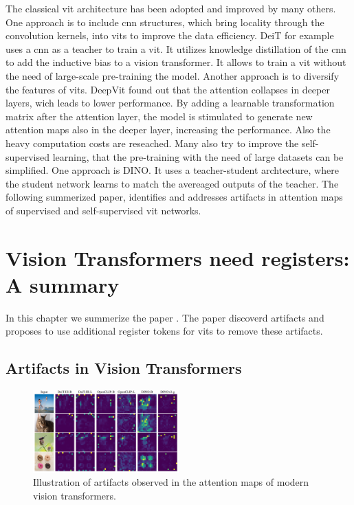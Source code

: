 \documentclass[conference]{IEEEtran}
\begin{document}
  The classical \ac{vit} architecture has been adopted and improved by many others. One approach is to include \ac{cnn} structures, which bring locality through the convolution kernels, into \acp{vit} to improve the data efficiency. DeiT \cite{deit} for example uses a \ac{cnn} as a teacher to train a \ac{vit}. It utilizes knowledge distillation of the \ac{cnn} to add the inductive bias to a vision transformer. It allows to train a \ac{vit} without the need of large-scale pre-training the model. \cite{vit-state-challenges} Another approach is to diversify the features of \acp{vit}. DeepVit \cite{deepvit} found out that the attention collapses in deeper layers, wich leads to lower performance. By adding a learnable transformation matrix after the attention layer, the model is stimulated to generate new attention maps also in the deeper layer, increasing the performance. \cite{vit-state-challenges} Also the heavy computation costs are reseached. Many also try to improve the self-supervised learning, that the pre-training with the need of large datasets can be simplified. One approach is DINO. \cite{dino} It uses a teacher-student archtecture, where the student network learns to match the avereaged outputs of the teacher. \cite{vit-state-challenges} The following summerized paper, identifies and addresses artifacts in attention maps of supervised and self-supervised \ac{vit} networks.

  \cite{deit3} \cite{open-clip}

  \section{Vision Transformers need registers: A summary}

  In this chapter we summerize the paper \cite{registers}. The paper discoverd artifacts and proposes to use additional register tokens for \acp{vit} to remove these artifacts.

  \subsection{Artifacts in Vision Transformers}
  \begin{figure}
    \centering
    \includegraphics[width=0.5\textwidth]{figures/vits-artifacts.png}
    \caption{Illustration of artifacts observed in the attention maps of modern vision transformers. \cite{registers}}
    \label{fig:artifacts-observations}
  \end{figure}
\end{document}
